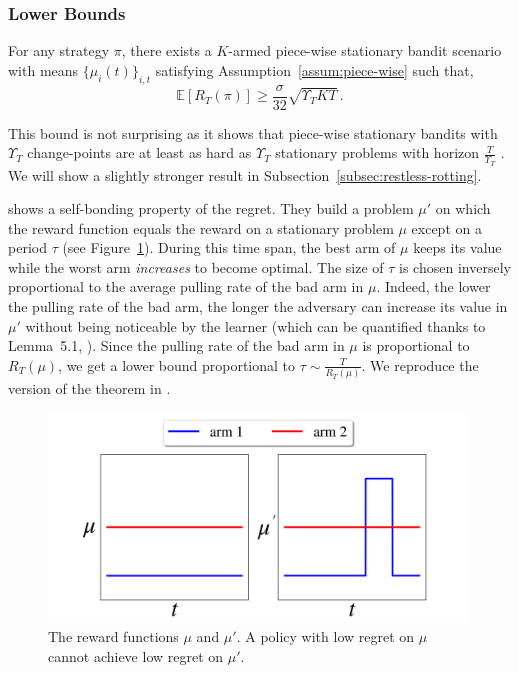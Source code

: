 \subsubsection{Lower Bounds}

\begin{proposition}
\label{prop:piecewise_lb}
For any strategy $\pi$, there exists a $K$-armed piece-wise stationary bandit scenario with means $\{\mu_i(t)\}_{i,t}$ satisfying Assumption~\ref{assum:piece-wise} such that,
\[
    \mathbb{E}\left[R_T(\pi)\right] \geq \frac{\sigma}{32}\sqrt{ \Upsilon_T KT}\,.
\]
\end{proposition}

This bound is not surprising as it shows that piece-wise stationary bandits with $\Upsilon_T$ change-points are at least as hard as $\Upsilon_T$ stationary problems with horizon $\frac{T}{\Upsilon_T}$ \citep{auer2002nonstochastic}. We will show a slightly stronger result in Subsection~\ref{subsec:restless-rotting}.

\citet{garivier2011upper-confidence-bound} shows a self-bonding property of the regret. They build a problem $\mu'$ on which the reward function equals the reward on a stationary problem $\mu$ except on a period $\tau$ (see Figure~\ref{fig:garivier-lb}). During this time span, the best arm of $\mu$ keeps its value while the worst arm \textit{increases} to become optimal. The size of $\tau$ is chosen inversely proportional to the average pulling rate of the bad arm in $\mu$. Indeed, the lower the pulling rate of the bad arm, the longer the adversary can increase its value in $\mu'$ without being noticeable by the learner (which can be quantified thanks to Lemma~5.1, \citet{auer2002nonstochastic}). Since the pulling rate of the bad arm in $\mu$ is proportional to $R_T(\mu)$, we get a lower bound proportional to $\tau \sim \frac{T}{R_T(\mu)}$. We reproduce the version of the theorem in \citet{lattimore2020banditbook}. 

\begin{figure}[h]
\centering
\includegraphics[clip, width= 0.99\textwidth]{2.2Restless/fig/garivier_lb.png}
\caption{The reward functions $\mu$ and $\mu'$. A policy with low regret on $\mu$ cannot achieve low regret on $\mu'$.}
\label{fig:garivier-lb}
\end{figure}

